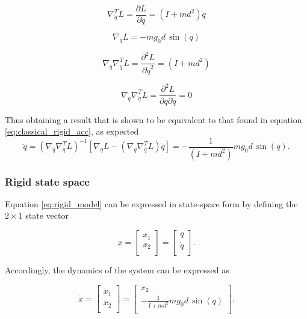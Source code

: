 \documentclass[a4paper]{article}
\begin{document}
\begin{equation}
    \nonumber
    \nabla_{\dot{q}}^{T} L = \frac{\partial L}{\partial \dot{q}} = (I+md^2)\dot{q}
\end{equation}

\begin{equation}
    \nonumber
    \nabla_{q} L = -mg_0d\,\sin(q)
\end{equation}

\begin{equation}
    \nonumber
    \nabla_{\dot{q}} \nabla_{\dot{q}}^{T} L = \frac{\partial^{2} L}{\partial \dot{q}^{2}} = (I+md^2)
\end{equation}

\begin{equation}
    \nonumber
    \nabla_{q} \nabla_{\dot{q}}^{T} L = \frac{\partial^{2} L}{\partial{q} \partial{\dot{q}}} = 0
\end{equation}

Thus obtaining a result that is shown to be equivalent to that found in equation \eqref{eq:classical_rigid_acc}, as expected
\begin{equation}
    \nonumber
    \ddot{q} = (\nabla_{\dot{q}}\nabla_{\dot{q}}^T L)^{-1} [\nabla_{q} L - (\nabla_{q}\nabla_{\dot{q}}^T L)\dot{q}] = -\frac{1}{(I+md^2)}mg_0d\, \sin(q).
\end{equation}

\subsubsection{Rigid state space}
Equation \ref{eq:rigid_model} can be expressed in state-space form by defining the $2\times1$ state vector

\begin{equation}
    \nonumber
    x = 
    \begin{bmatrix}    
        x_1 \\
        x_2 \\
    \end{bmatrix} = \begin{bmatrix}    
        q\\
        \dot{q}\\
    \end{bmatrix}.
\end{equation}

Accordingly, the dynamics of the system can be expressed as

\begin{equation}
    \nonumber
    \dot{x} = 
    \begin{bmatrix}    
        \dot{x}_1 \\
        \dot{x}_2 \\
    \end{bmatrix} = \begin{bmatrix}    
        x_2\\
        -\frac{1}{I+md^2}mg_0d\, \sin(q)\\
    \end{bmatrix}.
\end{equation}
\end{document}
